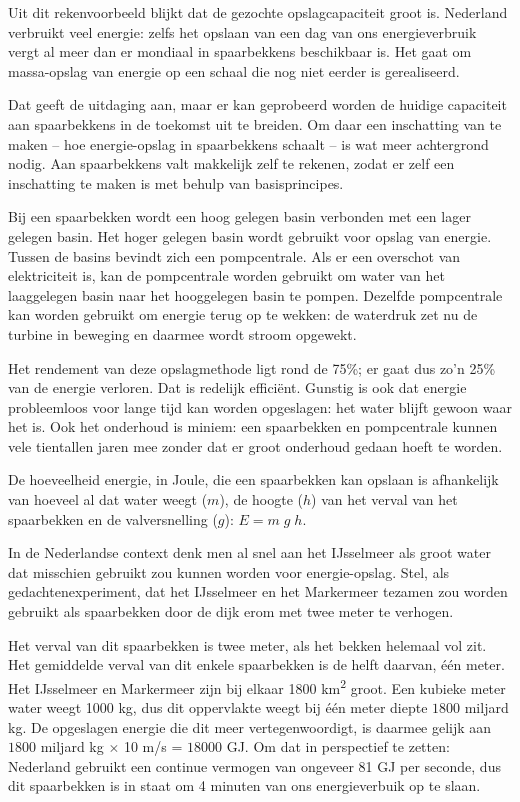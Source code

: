 \documentclass[
  11pt,
  a4paper,
]{book}
\begin{document}
Uit dit rekenvoorbeeld blijkt dat de gezochte opslagcapaciteit groot is. Nederland verbruikt veel energie: zelfs het opslaan van een dag van ons energieverbruik vergt al meer dan er mondiaal in spaarbekkens beschikbaar is. Het gaat om massa-opslag van energie op een schaal die nog niet eerder is gerealiseerd.

Dat geeft de uitdaging aan, maar er kan geprobeerd worden de huidige capaciteit aan spaarbekkens in de toekomst uit te breiden. Om daar een inschatting van te maken -- hoe energie-opslag in spaarbekkens schaalt -- is wat meer achtergrond nodig. Aan spaarbekkens valt makkelijk zelf te rekenen, zodat er zelf een inschatting te maken is met behulp van basisprincipes.

Bij een spaarbekken wordt een hoog gelegen basin verbonden met een lager gelegen basin. Het hoger gelegen basin wordt gebruikt voor opslag van energie. Tussen de basins bevindt zich een pompcentrale. Als er een overschot van elektriciteit is, kan de pompcentrale worden gebruikt om water van het laaggelegen basin naar het hooggelegen basin te pompen. Dezelfde pompcentrale kan worden gebruikt om energie terug op te wekken: de waterdruk zet nu de turbine in beweging en daarmee wordt stroom opgewekt.

Het rendement van deze opslagmethode ligt rond de 75\%; er gaat dus zo'n 25\% van de energie verloren. Dat is redelijk efficiënt. Gunstig is ook dat energie probleemloos voor lange tijd kan worden opgeslagen: het water blijft gewoon waar het is. Ook het onderhoud is miniem: een spaarbekken en pompcentrale kunnen vele tientallen jaren mee zonder dat er groot onderhoud gedaan hoeft te worden.

De hoeveelheid energie, in Joule, die een spaarbekken kan opslaan is afhankelijk van hoeveel al dat water weegt (\(m\)), de hoogte (\(h\)) van het verval van het spaarbekken en de valversnelling (\(g\)): \(E = m \; g \; h\).

In de Nederlandse context denk men al snel aan het IJsselmeer als groot water dat misschien gebruikt zou kunnen worden voor energie-opslag. Stel, als gedachtenexperiment, dat het IJsselmeer en het Markermeer tezamen zou worden gebruikt als spaarbekken door de dijk erom met twee meter te verhogen.

Het verval van dit spaarbekken is twee meter, als het bekken helemaal vol zit. Het gemiddelde verval van dit enkele spaarbekken is de helft daarvan, één meter. Het IJsselmeer en Markermeer zijn bij elkaar 1800 km\textsuperscript{2} groot. Een kubieke meter water weegt 1000 kg, dus dit oppervlakte weegt bij één meter diepte \(1800\) miljard kg. De opgeslagen energie die dit meer vertegenwoordigt, is daarmee gelijk aan \(1800\) miljard kg \(\times\) 10 m/s = \(18000\) GJ. Om dat in perspectief te zetten: Nederland gebruikt een continue vermogen van ongeveer 81 GJ per seconde, dus dit spaarbekken is in staat om 4 minuten van ons energieverbuik op te slaan.
\end{document}
